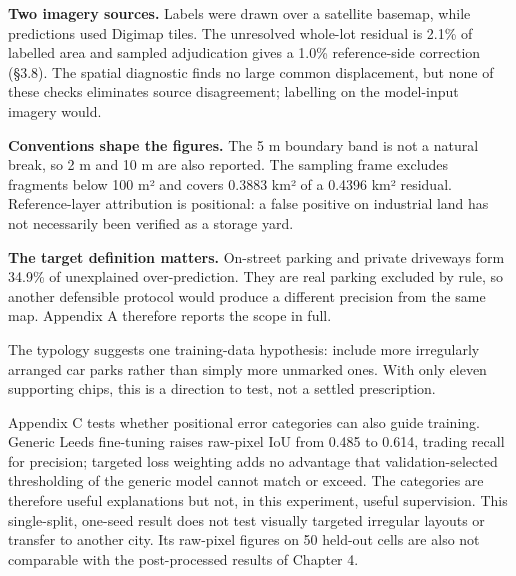\textbf{Two imagery sources.} Labels were drawn over a satellite basemap, while predictions used Digimap tiles. The unresolved whole-lot residual is 2.1\% of labelled area and sampled adjudication gives a 1.0\% reference-side correction (§3.8). The spatial diagnostic finds no large common displacement, but none of these checks eliminates source disagreement; labelling on the model-input imagery would.

\textbf{Conventions shape the figures.} The 5 m boundary band is not a natural break, so 2 m and 10 m are also reported. The sampling frame excludes fragments below 100 m² and covers 0.3883 km² of a 0.4396 km² residual. Reference-layer attribution is positional: a false positive on industrial land has not necessarily been verified as a storage yard.

\textbf{The target definition matters.} On-street parking and private driveways form 34.9\% of unexplained over-prediction. They are real parking excluded by rule, so another defensible protocol would produce a different precision from the same map. Appendix A therefore reports the scope in full.

The typology suggests one training-data hypothesis: include more irregularly arranged car parks rather than simply more unmarked ones. With only eleven supporting chips, this is a direction to test, not a settled prescription.

Appendix C tests whether positional error categories can also guide training. Generic Leeds fine-tuning raises raw-pixel IoU from 0.485 to 0.614, trading recall for precision; targeted loss weighting adds no advantage that validation-selected thresholding of the generic model cannot match or exceed. The categories are therefore useful explanations but not, in this experiment, useful supervision. This single-split, one-seed result does not test visually targeted irregular layouts or transfer to another city. Its raw-pixel figures on 50 held-out cells are also not comparable with the post-processed results of Chapter 4.
